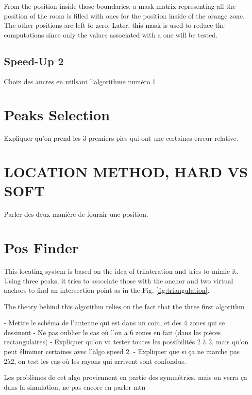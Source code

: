 From the position inside those boundaries, a mask matrix representing all the position of the room is filled with ones for the position inside of the orange zone. The other positions are left to zero. Later, this mask is used to reduce the computations since only the values associated with a one will be tested.

\subsection{Speed-Up 2}

Choix des ancres en utilsant l'algorithme numéro 1

\section{Peaks Selection}

Expliquer qu'on prend les 3 premiers pics qui ont une certaines erreur relative.

\color{red}
\section{LOCATION METHOD, HARD VS SOFT}
\color{black}

Parler des deux manière de fournir une position.

\section{Pos Finder}

This locating system is based on the idea of trilateration and tries to mimic it. Using three peaks, it tries to associate those with the anchor and two virtual anchors to find an intersection point as in the Fig. \ref{fig:triangulation}.

The theory behind this algorithm relies on the fact that the three first algorithm

- Mettre le schéma de l'antenne qui est dans un coin, et des 4 zones qui se dessinent
	- Ne pas oublier le cas où l'on a 6 zones en fait (dans les pièces rectangulaires)
- Expliquer qu'on va tester toutes les possibilités 2 à 2, mais qu'on peut éliminer certaines avec l'algo speed 2.
- Expliquer que si ça ne marche pas 2à2, on test les cas où les rayons qui arrivent sont confondus.


Les problèmes de cet algo proviennent en partie des symmétries, mais on verra ça dans la simulation, ne pas encore en parler mtn


